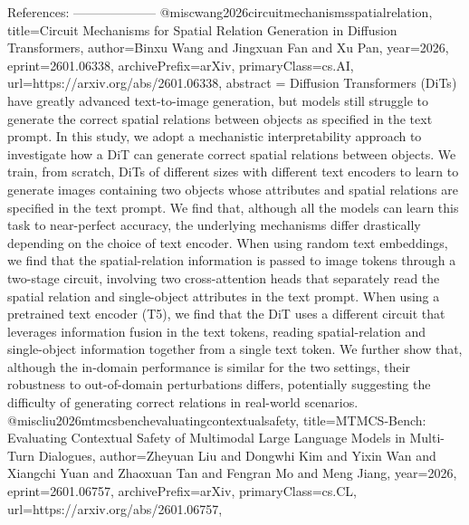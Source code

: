         References:
        --------------------
        @misc{wang2026circuitmechanismsspatialrelation,
      title={Circuit Mechanisms for Spatial Relation Generation in Diffusion Transformers}, 
      author={Binxu Wang and Jingxuan Fan and Xu Pan},
      year={2026},
      eprint={2601.06338},
      archivePrefix={arXiv},
      primaryClass={cs.AI},
      url={https://arxiv.org/abs/2601.06338},
      abstract = {Diffusion Transformers (DiTs) have greatly advanced text-to-image generation, but models still struggle to generate the correct spatial relations between objects as specified in the text prompt. In this study, we adopt a mechanistic interpretability approach to investigate how a DiT can generate correct spatial relations between objects. We train, from scratch, DiTs of different sizes with different text encoders to learn to generate images containing two objects whose attributes and spatial relations are specified in the text prompt. We find that, although all the models can learn this task to near-perfect accuracy, the underlying mechanisms differ drastically depending on the choice of text encoder. When using random text embeddings, we find that the spatial-relation information is passed to image tokens through a two-stage circuit, involving two cross-attention heads that separately read the spatial relation and single-object attributes in the text prompt. When using a pretrained text encoder (T5), we find that the DiT uses a different circuit that leverages information fusion in the text tokens, reading spatial-relation and single-object information together from a single text token. We further show that, although the in-domain performance is similar for the two settings, their robustness to out-of-domain perturbations differs, potentially suggesting the difficulty of generating correct relations in real-world scenarios.}
}@misc{liu2026mtmcsbenchevaluatingcontextualsafety,
      title={MTMCS-Bench: Evaluating Contextual Safety of Multimodal Large Language Models in Multi-Turn Dialogues}, 
      author={Zheyuan Liu and Dongwhi Kim and Yixin Wan and Xiangchi Yuan and Zhaoxuan Tan and Fengran Mo and Meng Jiang},
      year={2026},
      eprint={2601.06757},
      archivePrefix={arXiv},
      primaryClass={cs.CL},
      url={https://arxiv.org/abs/2601.06757},
}
